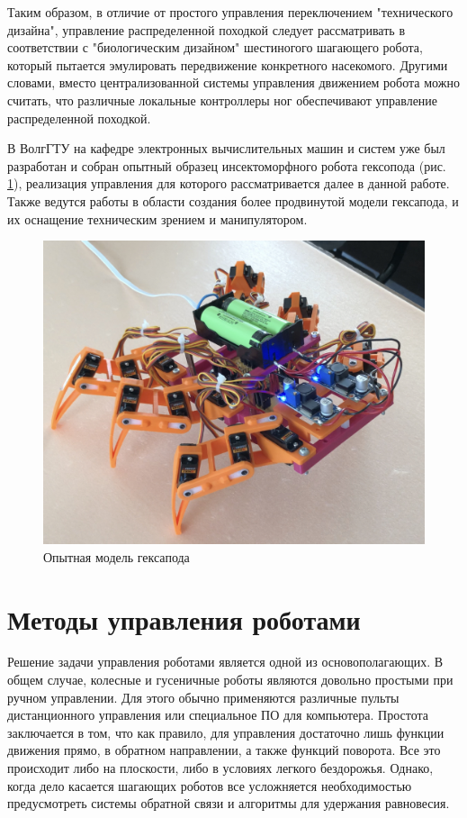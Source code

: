 Таким образом, в отличие от простого управления переключением "технического дизайна"{}, управление распределенной походкой следует рассматривать в соответствии с "биологическим дизайном"{} шестиногого шагающего робота, который пытается эмулировать передвижение конкретного насекомого. Другими словами, вместо централизованной системы управления движением робота можно считать, что различные локальные контроллеры ног обеспечивают управление распределенной походкой.

В ВолгГТУ на кафедре электронных вычислительных машин и систем уже был разработан и собран опытный образец инсектоморфного робота гексопода (рис. \ref{img:hexapod}), реализация управления для которого рассматривается далее в данной работе. Также ведутся работы в области создания более продвинутой модели гексапода, и их оснащение техническим зрением и манипулятором.

\begin{figure}[h!]
	\centering
	\includegraphics[width=0.65\linewidth]{img/hexapod}
	\caption{Опытная модель гексапода}
	\label{img:hexapod}
\end{figure}

\section{Методы управления роботами}

Решение задачи управления роботами является одной из основополагающих. В общем случае, колесные и гусеничные роботы являются довольно простыми при ручном управлении. Для этого обычно применяются различные пульты дистанционного управления или специальное ПО для компьютера. Простота заключается в том, что как правило, для управления достаточно лишь функции движения прямо, в обратном направлении, а также функций поворота. Все это происходит либо на плоскости, либо в условиях легкого бездорожья. Однако, когда дело касается шагающих роботов все усложняется необходимостью предусмотреть системы обратной связи и алгоритмы для удержания равновесия.

